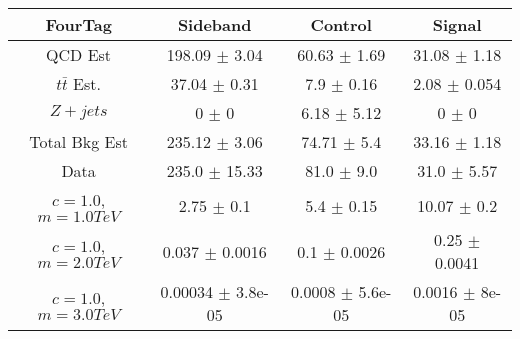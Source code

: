 \begin{footnotesize} 
\begin{tabular}{c|c|c|c} 
FourTag & Sideband & Control & Signal \\ 
\hline\hline 
QCD Est & 198.09 $\pm$ 3.04 & 60.63 $\pm$ 1.69 & 31.08 $\pm$ 1.18\\ 
$t\bar{t}$ Est.  & 37.04 $\pm$ 0.31 & 7.9 $\pm$ 0.16 & 2.08 $\pm$ 0.054\\ 
$Z+jets$ & 0 $\pm$ 0 & 6.18 $\pm$ 5.12 & 0 $\pm$ 0\\ 
Total Bkg Est & 235.12 $\pm$ 3.06 & 74.71 $\pm$ 5.4 & 33.16 $\pm$ 1.18\\ 
Data & 235.0 $\pm$ 15.33 & 81.0 $\pm$ 9.0 & 31.0 $\pm$ 5.57\\ 
$c=1.0$,$m=1.0TeV$ & 2.75 $\pm$ 0.1 & 5.4 $\pm$ 0.15 & 10.07 $\pm$ 0.2\\ 
$c=1.0$,$m=2.0TeV$ & 0.037 $\pm$ 0.0016 & 0.1 $\pm$ 0.0026 & 0.25 $\pm$ 0.0041\\ 
$c=1.0$,$m=3.0TeV$ & 0.00034 $\pm$ 3.8e-05 & 0.0008 $\pm$ 5.6e-05 & 0.0016 $\pm$ 8e-05\\ 
\hline\hline 
\end{tabular} 
\end{footnotesize} 
\newline 
